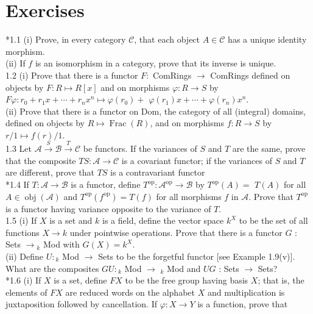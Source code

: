\documentclass[10pt, letterpaper]{article}
\begin{document}
\section*{Exercises}
*1.1 (i) Prove, in every category $\mathcal{C}$, that each object $A \in \mathcal{C}$ has a unique identity morphism.\\
(ii) If $f$ is an isomorphism in a category, prove that its inverse is unique.\\
1.2 (i) Prove that there is a functor $F:$ ComRings $\rightarrow$ ComRings defined on objects by $F: R \mapsto R[x]$ and on morphisms $\varphi: R \rightarrow S$ by $F \varphi: r_{0}+r_{1} x+\cdots+r_{n} x^{n} \mapsto \varphi\left(r_{0}\right)+$ $\varphi\left(r_{1}\right) x+\cdots+\varphi\left(r_{n}\right) x^{n}$.\\
(ii) Prove that there is a functor on Dom, the category of all (integral) domains, defined on objects by $R \mapsto \operatorname{Frac}(R)$, and on morphisms $f: R \rightarrow S$ by $r / 1 \mapsto f(r) / 1$.\\
1.3 Let $\mathcal{A} \xrightarrow{S} \mathcal{B} \xrightarrow{T} \mathcal{C}$ be functors. If the variances of $S$ and $T$ are the same, prove that the composite $T S: \mathcal{A} \rightarrow \mathcal{C}$ is a covariant functor; if the variances of $S$ and $T$ are different, prove that $T S$ is a contravariant functor\\
*1.4 If $T: \mathcal{A} \rightarrow \mathcal{B}$ is a functor, define $T^{\mathrm{op}}: \mathcal{A}^{\mathrm{op}} \rightarrow \mathcal{B}$ by $T^{\mathrm{op}}(A)=$ $T(A)$ for all $A \in \operatorname{obj}(\mathcal{A})$ and $T^{\mathrm{op}}\left(f^{\mathrm{op}}\right)=T(f)$ for all morphisms $f$ in $\mathcal{A}$. Prove that $T^{\text {op }}$ is a functor having variance opposite to the variance of $T$.\\
1.5 (i) If $X$ is a set and $k$ is a field, define the vector space $k^{X}$ to be the set of all functions $X \rightarrow k$ under pointwise operations. Prove that there is a functor $G$ : Sets $\rightarrow{ }_{k}$ Mod with $G(X)=k^{X}$.\\
(ii) Define $U:{ }_{k}$ Mod $\rightarrow$ Sets to be the forgetful functor [see Example 1.9(v)]. What are the composites $G U:{ }_{k}$ Mod $\rightarrow$ ${ }_{k}$ Mod and $U G$ : Sets $\rightarrow$ Sets?\\
*1.6 (i) If $X$ is a set, define $F X$ to be the free group having basis $X$; that is, the elements of $F X$ are reduced words on the alphabet $X$ and multiplication is juxtaposition followed by cancellation. If $\varphi: X \rightarrow Y$ is a function, prove that
\end{document}
